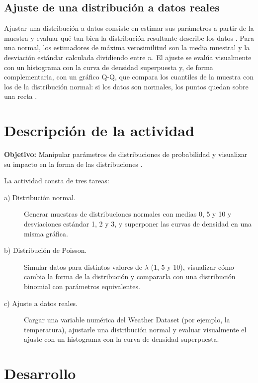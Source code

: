 \documentclass[11pt,letterpaper]{article}
\begin{document}
\subsection{Ajuste de una distribución a datos reales}

Ajustar una distribución a datos consiste en estimar sus parámetros a partir de la muestra y evaluar qué tan bien la distribución resultante describe los datos \parencite{tecnm2026_documento_fuente}. Para una normal, los estimadores de máxima verosimilitud son la media muestral y la desviación estándar calculada dividiendo entre $n$. El ajuste se evalúa visualmente con un histograma con la curva de densidad superpuesta y, de forma complementaria, con un gráfico Q-Q, que compara los cuantiles de la muestra con los de la distribución normal: si los datos son normales, los puntos quedan sobre una recta \parencite{bruce2020}.

\section{Descripción de la actividad}

\textbf{Objetivo:} Manipular parámetros de distribuciones de probabilidad y visualizar su impacto en la forma de las distribuciones \parencite{tecnm2026_documento_fuente}.

La actividad consta de tres tareas:

\begin{description}
    \item[a) Distribución normal.] Generar muestras de distribuciones normales con medias 0, 5 y 10 y desviaciones estándar 1, 2 y 3, y superponer las curvas de densidad en una misma gráfica.
    \item[b) Distribución de Poisson.] Simular datos para distintos valores de $\lambda$ (1, 5 y 10), visualizar cómo cambia la forma de la distribución y compararla con una distribución binomial con parámetros equivalentes.
    \item[c) Ajuste a datos reales.] Cargar una variable numérica del Weather Dataset (por ejemplo, la temperatura), ajustarle una distribución normal y evaluar visualmente el ajuste con un histograma con la curva de densidad superpuesta.
\end{description}

\section{Desarrollo}
\end{document}
